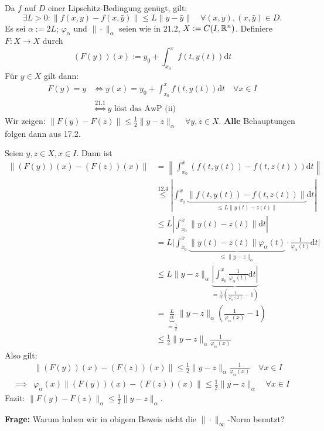 \documentclass[a4paper,twoside,DIV15,BCOR12mm,chapterprefix=true,headings=twolinechapter]{scrbook}
\begin{document}
\begin{beweis}
Da $f$ auf $D$ einer Lipschitz-Bedingung genügt, gilt:
\[ \exists L > 0: \|f(x,y) - f(x, \bar y )\| \leq L \|y- \bar y \| \quad \forall(x,y), (x, \bar y ) \in D.\]
Es sei $\alpha := 2L$; $\varphi_\alpha$ und $\|\cdot\|_\alpha$ seien wie in 21.2, $X := C(I, \mathbb{R}^n)$. Definiere $F: X \to X$ durch 
\[(F(y))(x) := y_0 + \int_{x_0}^x f(t, y(t))\text{d}t\]
Für $y \in X$ gilt dann:
\begin{align*}
F(y) = y &\iff y(x) = y_0 + \int_{x_0}^x f(t, y(t))\text{d}t \quad \forall x \in I \\
&\stackrel{21.1}\iff y \text{ löst das AwP (ii)}
\end{align*} 
Wir zeigen: $\|F(y)-F(z)\| \leq \frac12 \|y-z\|_\alpha \quad \forall y,z \in X$. \textbf{Alle} Behauptungen folgen dann aus 17.2.

Seien $y,z \in X, x \in I$. Dann ist
\begin{align*}
\|(F(y))(x) - (F(z))(x)\|&= \left\|\int_{x_0}^x (f(t, y(t)) - f(t, z(t)))\text{d}t \right\|\\
&\stackrel{12.4}\le \left| \int_{x_0}^x \underbrace{\|f(t, y(t)) - f(t,z(t))\|}_{\le L \|y(t)-z(t)\|} \text{d}t \right|\\
&\le L \left| \int_{x_0}^x \|y(t)-z(t)\| \text{d}t \right|\\
&= L \lvert \int_{x_0}^x \underbrace{\|y(t)-z(t)\| \varphi_\alpha (t)}_{\leq \|y-z\|_\alpha} \cdot \frac1{\varphi_\alpha(t)}\text{d}t \rvert\\
&\le L \|y-z\|_\alpha \underbrace{\left| \int_{x_0}^x \frac1{\varphi_\alpha(t) }\text{d}t\right|}_{=\frac1\alpha \left(  \frac1{\varphi_\alpha(x)} - 1 \right) }\\
&= \underbrace{\frac{L}{\alpha}}_{=\frac12} \|y-z\|_\alpha \left(\frac1{\varphi_\alpha(x)} -1 \right)\\ 
&\le \frac12 \|y-z\|_\alpha \frac{1}{\varphi_\alpha(x)}
\end{align*}
Also gilt: 
\begin{align*}
&\|(F(y))(x) - (F(z))(x)\| \leq \frac12 \|y-z\|_\alpha \frac{1}{\varphi_\alpha(x)} \quad \forall x \in I\\
\implies &\varphi_\alpha(x) \|(F(y))(x) - (F(z))(x)\| \leq \frac12 \|y-z\|_\alpha \quad \forall x \in I
\end{align*}
Fazit: $\|F(y)-F(z)\|_\alpha \leq \frac12 \|y-z\|_\alpha$.
\end{beweis}

\textbf{Frage: } Warum haben wir in obigem Beweis nicht die $\|\cdot \|_\infty$-Norm benutzt?
\end{document}
